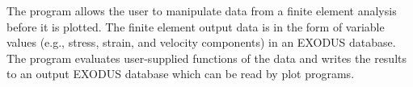 The \caps{\PROGRAM} program allows the user to manipulate data from a
finite element analysis before it is plotted. The finite element output
data is in the form of variable values (e.g., stress, strain, and
velocity components) in an EXODUS database. The \caps{\PROGRAM} program
evaluates user-supplied functions of the data and writes the results to
an output EXODUS database which can be read by plot programs.

